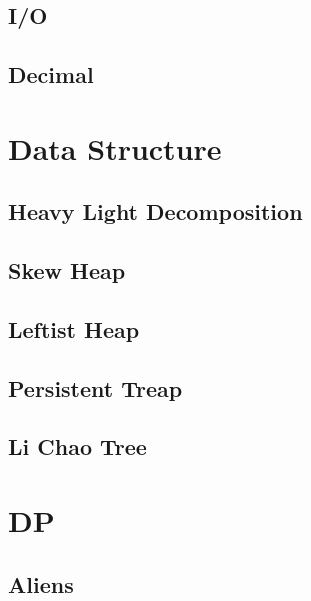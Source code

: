 \documentclass[a4paper,10pt,twocolumn,oneside]{article}
\begin{document}
\subsection{I/O}


\subsection{Decimal}


\section{Data Structure}

\subsection{Heavy Light Decomposition}


\subsection{Skew Heap}


\subsection{Leftist Heap}


\subsection{Persistent Treap}


\subsection{Li Chao Tree}


\section{DP}

\subsection{Aliens}

\end{document}
